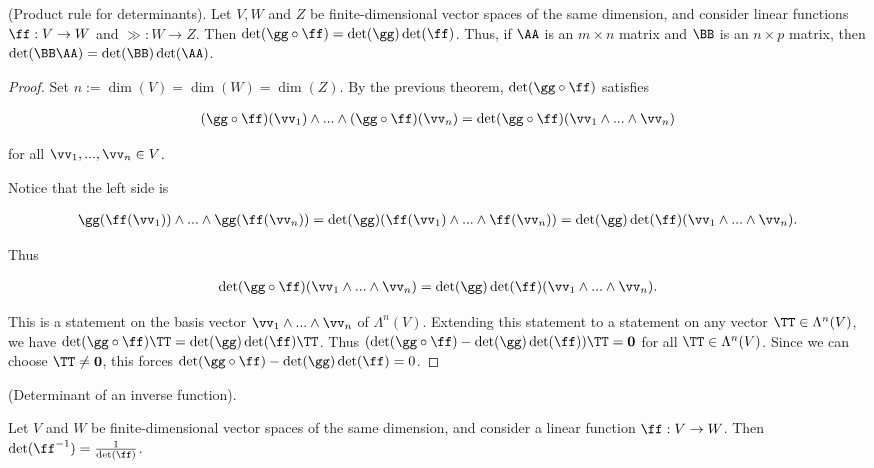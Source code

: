 \begin{theorem}
    (Product rule for determinants). Let $V, W$ and $Z$ be finite-dimensional vector spaces of the same dimension, and consider linear functions $\ff:V \rightarrow W$ and $\gg:W \rightarrow Z$. Then $\det(\gg \circ \ff) = \det(\gg) \det(\ff)$. Thus, if $\AA$ is an $m \times n$ matrix and $\BB$ is an $n \times p$ matrix, then $\det(\BB \AA) = \det(\BB) \det(\AA)$.
\end{theorem}

\begin{proof}
   Set $n := \dim(V) = \dim(W) = \dim(Z)$. By the previous theorem, $\det(\gg \circ \ff)$ satisfies
   
   \begin{align*}
       (\gg \circ \ff)(\vv_1) \wedge ... \wedge (\gg \circ \ff)(\vv_n) = \det(\gg \circ \ff) (\vv_1 \wedge ... \wedge \vv_n)
   \end{align*}
   
   for all $\vv_1, ..., \vv_n \in V$.
   
   Notice that the left side is
   
   \begin{align*}
       \gg(\ff(\vv_1)) \wedge ... \wedge \gg(\ff(\vv_n)) = \det(\gg) (\ff(\vv_1) \wedge ... \wedge \ff(\vv_n)) =
       \det(\gg) \det(\ff) (\vv_1 \wedge ... \wedge \vv_n).
   \end{align*}
   
   Thus
   
   \begin{align*}
       \det(\gg \circ \ff) (\vv_1 \wedge ... \wedge \vv_n) = \det(\gg) \det(\ff) (\vv_1 \wedge ... \wedge \vv_n).
   \end{align*}
   
   This is a statement on the basis vector $\vv_1 \wedge ... \wedge \vv_n$ of $\Lambda^n(V)$. Extending this statement to a statement on any vector $\TT \in \Lambda^n(V)$, we have $\det(\gg \circ \ff) \TT = \det(\gg) \det(\ff) \TT$. Thus ${(\det(\gg \circ \ff) - \det(\gg) \det(\ff)) \TT = \mathbf{0}}$ for all $\TT \in \Lambda^n(V)$. Since we can choose $\TT \neq \mathbf{0}$, this forces $\det(\gg \circ \ff) - \det(\gg) \det(\ff) = 0$.
\end{proof}

\begin{theorem}
    (Determinant of an inverse function).
    
    Let $V$ and $W$ be finite-dimensional vector spaces of the same dimension, and consider a linear function $\ff:V \rightarrow W$. Then $\det(\ff^{-1}) = \frac{1}{\det(\ff)}$.
\end{theorem}

